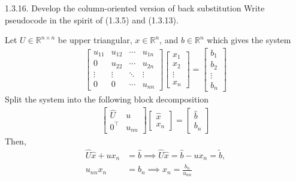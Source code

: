 \documentclass{report}
\begin{document}
    \pagebreak \bigbreak \noindent 
    \begin{mdframed}
        1.3.16. Develop the column-oriented version of back substitution Write pseudocode in the spirit of (1.3.5) and (1.3.13).
    \end{mdframed}
    \bigbreak \noindent 
    Let $U \in \mathbb{R}^{n\times n}$ be upper triangular, $x \in \mathbb{R}^{n}$, and $ b \in \mathbb{R}^{n}$ which gives the system
    \begin{align*}
       \begin{bmatrix}
           u_{11} & u_{12} & \cdots & u_{1n} \\
           0 & u_{22} & \cdots & u_{2n} \\
           \vdots & \vdots & \ddots & \vdots \\
           0 & 0 & \cdots & u_{nn}
       \end{bmatrix} 
       \begin{bmatrix}
           x_{1} \\ x_{2} \\ \vdots \\ x_{n}
       \end{bmatrix}
        = 
        \begin{bmatrix}
            b_{1} \\ b_{2} \\ \vdots \\ b_{n}
        \end{bmatrix}
    \end{align*}
    Split the system into the following block decomposition
    \begin{align*}
        \begin{bmatrix}
            \hat{U} & u \\
            0^{\top} & u_{nn}
        \end{bmatrix}
        \begin{bmatrix}
            \hat{x} \\ x_{n}
        \end{bmatrix}
        = 
        \begin{bmatrix}
            \hat{b} \\ b_{n}
        \end{bmatrix}
    \end{align*}
    Then,
    \begin{align*}
        \hat{U}\hat{x} + ux_{n} &= \hat{b} \implies \hat{U}\hat{x} = \hat{b} - ux_{n} = \tilde{b}, \\
        u_{nn}x_{n} &= b_{n} \implies x_{n} = \frac{b_{n}}{u_{nn}}
    \end{align*}
\end{document}

